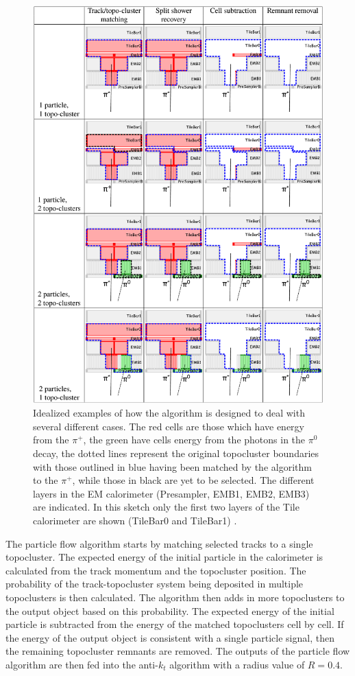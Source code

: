 	\begin{figure}[!ht]
	\centering
	\includegraphics[width=.75\textwidth,keepaspectratio=true]{chapters/chapter5_eventreconnstruction/images/pflow_example.png}
	\caption{\label{fig:pflow-example} Idealized examples of how the algorithm is designed to deal with several different cases. The red cells are those which have energy from the $\pi^{+}$, the green have cells energy from the photons in the $\pi^{0}$  decay, the dotted lines represent the original topocluster boundaries with those outlined in blue having been matched by the algorithm to the $\pi^{+}$, while those in black are yet to be selected. The different layers in the EM calorimeter (Presampler, EMB1, EMB2, EMB3) are indicated. In this sketch only the first two layers of the Tile calorimeter are shown (TileBar0 and TileBar1) \cite{pflow}.}
	\end{figure}

	The particle flow algorithm starts by matching selected tracks to a single topocluster. The expected energy of the initial particle in the calorimeter is calculated from the track momentum and the topocluster position. The probability of the track-topocluster system being deposited in multiple topoclusters is then calculated. The algorithm then adds in more topoclusters to the output object based on this probability. The expected energy of the initial particle is subtracted from the energy of the matched topoclusters cell by cell. If the energy of the output object is consistent with a single particle signal, then the remaining topocluster remnants are removed. The outputs of the particle flow algorithm are then fed into the anti-$k_t$ algorithm \cite{anti-kt} with a radius value of $R=0.4$. 

